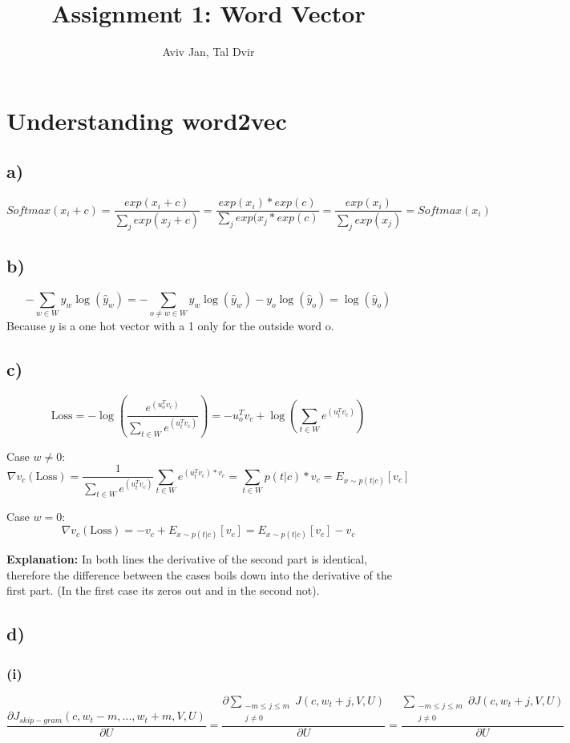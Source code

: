 \documentclass{article}
\title{Assignment 1: Word Vector}
\author{Aviv Jan, Tal Dvir}
\begin{document}
\maketitle


\section{Understanding word2vec}
\subsection*{a)}
\[
Softmax(x_i+c) = \frac{exp(x_i+c)}{\sum_{j} exp(x_j + c)} = \frac{exp(x_i) * exp(c)}{\sum_{j} exp(x_j * exp(c)} = \frac{exp(x_i)}  {\sum_{j} exp(x_j)} = Softmax(x_i)
\]

\subsection*{b)}
\[
-\sum_{w \in W} y_w \log(\hat{y}_w) = -\sum_{o\neq w \in W} y_w \log(\hat{y}_w) - y_o \log(\hat{y}_o)=\log(\hat{y}_o)
\]
\newline
Because $y$ is a one hot vector with a 1 only for the outside word o.

\subsection*{c)}
\[
\text{Loss} = -\log \left( \frac{e^{(u_o^T v_c)}}{\sum_{t \in W} e^{(u_t^T v_c)}} \right) = -u_o^T v_c +\log \left( \sum_{t \in W} e^{(u_t^T v_c)} \right)
\]

Case $w \neq 0:$
\[
\nabla{v_c}(\text{Loss}) = \frac{1}{\sum_{t \in W} e^{(u_t^T v_c)}}  \sum_{t \in W} e^{(u_t^T v_c) *v_c} =   \sum_{t \in W} p(t|c)*v_c = E_{x\sim p(t|c)} [v_c]
\]

Case $w = 0:$
\[
\nabla{v_c}(\text{Loss}) = -v_c + E_{x\sim p(t|c)} [v_c] = E_{x\sim p(t|c)} [v_c] - v_c
\]


\textbf{Explanation:}
In both lines the derivative of the second part is identical, therefore the difference between the cases boils down into the derivative of the first part. (In the first case its zeros out and in the second not).

\clearpage
\subsection*{d)}
\subsubsection*{(i)}
\[
\frac{\partial J_{skip-gram}(c, w_t-m,...,w_t+m, V, U)}{\partial U} = 
\frac{\partial\sum_{\substack{-m \leq j \leq m \\ j \neq 0}} J(c, w_t+j, V, U)}{\partial U} = \frac{\sum_{\substack{-m \leq j \leq m \\ j \neq 0}}\partial J(c, w_t+j, V, U)}{\partial U}
\]
\end{document}
